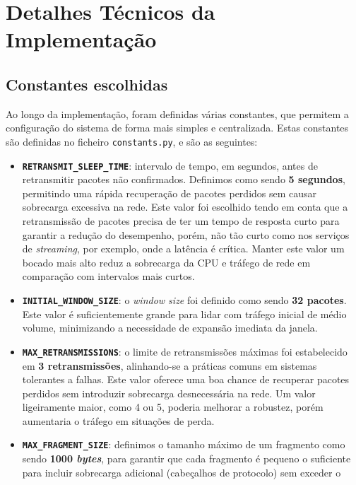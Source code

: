 \documentclass[a4paper,12pt]{scrreprt}
\begin{document}
\clearpage

\section{Detalhes Técnicos da Implementação}

\subsection{Constantes escolhidas}

Ao longo da implementação, foram definidas várias constantes, que permitem a
configuração do sistema de forma mais simples e centralizada. Estas constantes
são definidas no ficheiro \texttt{constants.py}, e são as seguintes:
\begin{itemize}
    \item \textbf{\texttt{RETRANSMIT\_SLEEP\_TIME}}: intervalo de tempo, em segundos, antes de retransmitir pacotes não confirmados.
    Definimos como sendo \textbf{5 segundos}, permitindo uma rápida recuperação de pacotes perdidos sem causar sobrecarga excessiva na rede.
    Este valor foi escolhido tendo em conta que a retransmissão de pacotes precisa de ter um tempo de resposta curto para garantir a
    redução do desempenho, porém, não tão curto como nos serviços de \textit{streaming}, por exemplo, onde a latência é crítica.
    Manter este valor um bocado mais alto reduz a sobrecarga da CPU e tráfego de rede em comparação com intervalos mais curtos.
    \item \textbf{\texttt{INITIAL\_WINDOW\_SIZE}}: o \textit{window size} foi definido como sendo \textbf{32 pacotes}. 
    Este valor é suficientemente grande para lidar com tráfego inicial de médio volume, minimizando a necessidade de expansão imediata da janela. 
    \item \textbf{\texttt{MAX\_RETRANSMISSIONS}}: o limite de retransmissões máximas foi estabelecido em \textbf{3 retransmissões},
    alinhando-se a práticas comuns em sistemas tolerantes a falhas. Este valor oferece uma boa chance de recuperar pacotes perdidos sem
    introduzir sobrecarga desnecessária na rede. Um valor ligeiramente maior, como 4 ou 5, poderia melhorar a robustez, porém aumentaria
    o tráfego em situações de perda.
    \item \textbf{\texttt{MAX\_FRAGMENT\_SIZE}}: definimos o tamanho máximo de um fragmento como sendo \textbf{1000 \textit{bytes}},
    para garantir que cada fragmento é pequeno o suficiente para incluir sobrecarga adicional (cabeçalhos de protocolo) sem exceder o 

\end{itemize}
\end{document}
